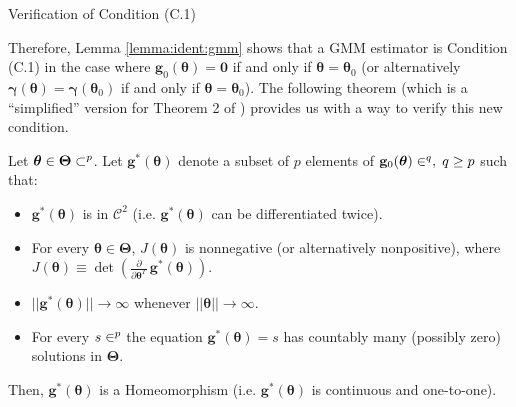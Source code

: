 \documentclass[envcountsect,usenames,dvipsnames]{beamer}
\def\btheta{\bm \theta}
\def\bTheta{\bm \Theta}
\def\bgamma{\bm \gamma}
\def\g{\mathbf{g}}
\theoremstyle{mystyle}
\begin{document}
\begin{frame}{Verification of Condition {\color{beamer@UIUCblue}(C.1)}}
\footnotesize

Therefore, Lemma \ref{lemma:ident:gmm} shows that a GMM estimator is Condition {\color{beamer@UIUCblue}(C.1)} in the case where $\g_0 (\btheta) = \mathbf{0}$ if and only if $\btheta = \btheta_0$ (or alternatively $\bgamma (\btheta) = \bgamma (\btheta_0)$ if and only if $\btheta = \bm{\theta}_0$). The following theorem (which is a ``simplified'' version for Theorem 2 of \cite{komunjer2012global}) provides us with a way to verify this new condition.

\begin{Theorem}[Homeomorphism]
\label{Thm:homeo:gmm}
Let $\bm{\theta} \in \bm{\Theta} \subset \real^p$. Let $\g^*(\btheta)$ denote a subset of $p$ elements of $\g_0 (\btheta) \in \real^q, \; q \geq p$ such that:
\begin{itemize}
    \item $\g^*(\btheta)$ is in $\mathcal{C}^2$ (i.e. $\g^*(\btheta)$ can be differentiated twice).  
    \item For every $\btheta \in \bm{\Theta}$, $J(\btheta)$ is nonnegative (or alternatively nonpositive), where $J(\btheta) \equiv \det \left(\frac{\partial}{\partial \bm{\theta}^T}\, \g^*(\btheta) \right)$. 
    \item $||\g^*(\btheta)|| \to \infty$ whenever $|| \btheta || \to \infty$.
    \item For every $s \in \real^p$ the equation $\g^*(\btheta) = s$ has countably many (possibly zero) solutions in $\bTheta$.
\end{itemize}
Then, $\g^*(\btheta)$ is a Homeomorphism (i.e. $\g^*(\btheta)$ is continuous and one-to-one).
\end{Theorem}
\end{frame}
\end{document}

